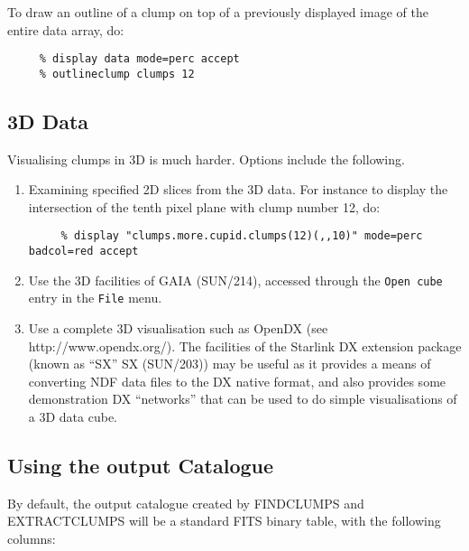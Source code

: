 \documentclass[twoside,11pt]{article}
\newcommand{\htmladdnormallink}[2]{#1}
\newcommand{\latex}[1]{#1}
\newcommand{\xref}[3]{#1}
\renewcommand{\_}{\texttt{\symbol{95}}}
\begin{document}
To draw an outline of a clump on top of a previously displayed image of
the entire data array, do:

\small
\begin{verbatim}
     % display data mode=perc accept
     % outlineclump clumps 12
\end{verbatim}
\normalsize

\subsection{3D Data}

Visualising clumps in 3D is much harder. Options include the following.

\begin{enumerate}

\item Examining specified 2D slices from the 3D data. For instance to
display the intersection of the tenth pixel plane with clump number 12, do:

\small
\begin{verbatim}
     % display "clumps.more.cupid.clumps(12)(,,10)" mode=perc badcol=red accept
\end{verbatim}
\normalsize

\item Use the 3D facilities of \xref{GAIA}{sun214}{} \latex{(SUN/214)},
accessed through the \verb+Open cube+ entry in the \verb+File+ menu.

\item Use a complete 3D visualisation such as OpenDX (see
\htmladdnormallink{http://www.opendx.org/}{{\tt http://www.opendx.org/}}). The
facilities of the Starlink DX extension package (known as ``SX''
\xref{SX}{sun203}{} \latex{(SUN/203)}) may be useful as it provides
a means of converting NDF data files to the DX native format, and also
provides some demonstration DX ``networks'' that can be used to do simple
visualisations of a 3D data cube.

\end{enumerate}


\subsection{Using the output Catalogue}
By default, the output catalogue created by FINDCLUMPS and EXTRACTCLUMPS
will be a standard FITS binary table, with the following columns:
\end{document}
